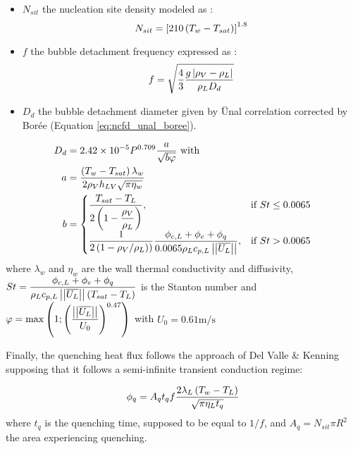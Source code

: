 \begin{itemize}
\item $N_{sit}$ the nucleation site density modeled as \cite{lemmert_influence_1977}:
\begin{equation}
N_{sit}=\left[ 210\left( T_{w}-T_{sat} \right)  \right]^{1.8}
\label{eq:nsit_NCFD}
\end{equation}

\item $f$ the bubble detachment frequency expressed as \cite{cole_bubble_1967}: 
\begin{equation}
f=\sqrt{\frac{4}{3}\frac{g\left| \rho_{V}-\rho_{L} \right| }{\rho_{L}D_{d}}}
\end{equation}

\item $D_{d}$ the bubble detachment diameter given by \"Unal correlation \cite{unal_maximum_1976} corrected by Bor\'ee \etal \cite{boree_ecoulements_1992} (Equation \ref{eq:ncfd_unal_boree}).

\end{itemize}



\begin{align}
D_{d}&=2.42\times 10^{-5} P^{0.709} \frac{a}{\sqrt{b\varphi}}\text{ with }
  \label{eq:ncfd_unal_boree}\\
 a&=\frac{\left( T_{w}-T_{sat} \right) \lambda_{w}}{2\rho_{V}h_{LV}\sqrt{\pi\eta_{w}}}\\
  b&=\begin{cases}
    \dfrac{T_{sat}-T_{L}}{2 \left( 1-\dfrac{\rho_{V}}{\rho_{L}}  \right)}, & \text{if $St\leq0.0065$}\\
    \dfrac{1}{2 \left( 1-\rho_{V}/\rho_{L}  \right))}\dfrac{\phi_{c,L}+\phi_{e}+\phi_{q}}{0.0065\rho_{L}c_{p,L}\left|\left|{\overline{U_{L}}}\right|\right|}, & \text{\text{if $St>0.0065$}}
    \end{cases}
\end{align}
where $\lambda_{w}$ and $\eta_{w}$ are the wall thermal conductivity and diffusivity, $St=\dfrac{\phi_{c,L}+\phi_{e}+\phi_{q}}{\rho_{L}c_{p,L}\left|\left|{\overline{U_{L}}}\right|\right|\left( T_{sat}-T_{L}  \right)}$ is the Stanton number and $\varphi=\displaystyle \mathrm{max}\left( 1 ; \left( \frac{\left|\left|{\overline{U_{L}}}\right|\right|}{U_{0}}  \right)^{0.47}  \right)$ with $U_{0}=0.61\text{m/s}$

\npar

Finally, the quenching heat flux follows the approach of {Del Valle} \& {Kenning} \cite{del_valle_subcooled_1985} supposing that it follows a semi-infinite transient conduction regime: 

\begin{equation}
\phi_{q}=A_{q}t_{q}f\frac{2\lambda_{L} \left( T_{w}-T_{L} \right)}{\sqrt{\pi \eta_{L}t_{q}}}
\label{eq:ncfd_phiq}
\end{equation} 
where $t_{q}$ is the quenching time, supposed to be equal to $1/f$, and $A_{q}=N_{sit} \pi R^{2}$ the area experiencing quenching.



